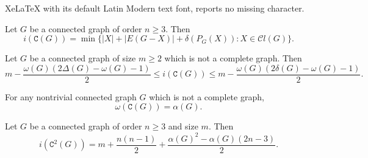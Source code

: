 \documentclass[10pt,a4paper]{amsart}
\begin{document}
XeLaTeX with its default Latin Modern text font, reports no missing character.
\begin{theorem}\label{theo-i-C(G)}
Let $G$ be a connected graph of order $n\geq 3$. Then
$$i (\mathtt{C}(G)) = \min \{ |X| + |E(G-X)| + \delta(P_{G}(X)): X\in \mathcal{C}l(G)\}.$$
\end{theorem}

\begin{theorem}\label{theo-lower-upper-bounds}
Let $G$ be a connected graph of size $m\geq 2$ which is not a complete graph. Then
$$m- \frac{\omega(G)(2\Delta(G)-\omega(G)-1)}{2}\leq i(\mathtt{C}(G))\leq m- \frac{\omega(G)(2\delta(G)-\omega(G)-1)}{2}.$$
\end{theorem}

\begin{proposition}\label{prop-clique}
For any nontrivial connected graph $G$ which is not a complete graph,
$$\omega(\mathtt{C}(G)) = \alpha(G).$$
\end{proposition}

\begin{theorem}
Let $G$ be a connected graph of order $n\geq 3$ and size $m$. Then
$$i (\mathtt{C}^{2}(G)) = m + \frac{n(n-1)}{2} + \frac{\alpha(G)^{2} - \alpha(G) (2n-3)}{2}.$$
\end{theorem}
\end{document}
